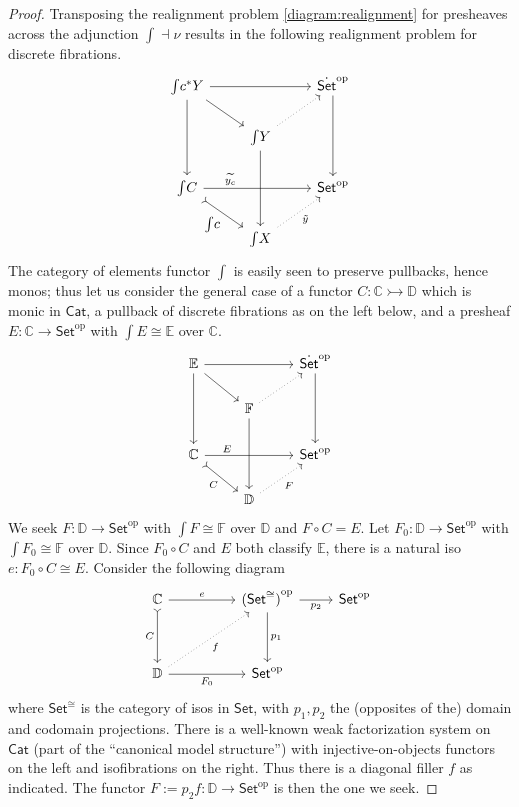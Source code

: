 \documentclass[11pt]{article}
\newcommand{\C}{\ensuremath{\mathbb{C}}}
\newcommand{\D}{\ensuremath{\mathbb{D}}}
\newcommand{\op}[1]{\ensuremath{{#1}^{\mathrm{op}}}}
\newcommand{\Set}{\ensuremath{\mathsf{Set}}}
\newcommand{\Cat}{\ensuremath{\mathsf{Cat}}}
\newcommand{\mono}{\ensuremath{\rightarrowtail}}
\renewcommand{\to}{\ensuremath{\rightarrow}}
\newcommand{\elem}[1]{\textstyle\int\!{#1}}
\theoremstyle{remark}
\theoremstyle{definition}
\begin{document}
\begin{proof}
Transposing the realignment problem \eqref{diagram:realignment} for presheaves across the adjunction $\int\dashv \nu$ results in the following realignment problem for discrete fibrations.
\begin{equation}\label{diagram:realignment2}
\begin{tikzcd}
\elem  c^*Y \ar[dd] \ar[rd] \ar[rr] && \op{\dot{\Set}}  \ar[dd] \\
&\elem  Y \ar[dd] \ar[ru, dotted] & \\
\elem  C  \ar[rd, tail,swap, "{\elem  c}"] \ar[rr, near start, "\widetilde{y_c}"] && \op{{\Set}}   \\
& \elem  X \ar[ru, dotted, swap, "\tilde{y}"] &
\end{tikzcd}
\end{equation}
The category of elements functor $\int $ is easily seen to preserve pullbacks, hence monos; thus let us consider the general case of a functor  $C : \C \mono \D$ which is monic in $\Cat$, a pullback of discrete fibrations as on the left below, and a presheaf $E : \C \to  \op{{\Set}}$ with $\elem E \cong \mathbb{E}$ over $\C$. 
\begin{equation}\label{diagram:realignment3}
\begin{tikzcd}
\mathbb{E} \ar[dd] \ar[rd] \ar[rr] && \op{\dot{\Set}}  \ar[dd] \\
& \mathbb{F}  \ar[dd] \ar[ru, dotted] & \\
\C  \ar[rd, tail,swap, "{C}"] \ar[rr, near start, "E"] && \op{{\Set}}   \\
& \D \ar[ru, dotted, swap, "F"] &
\end{tikzcd}
\end{equation}
We seek $F : \D \to  \op{{\Set}}$ with $\elem F \cong \mathbb{F}$ over $\D$ and $F\circ C = E$.  Let $F_0 : \D \to  \op{\Set}$ with $\elem F_0 \cong \mathbb{F}$ over $\D$.  Since $F_0\circ C$ and $E$ both classify $\mathbb{E}$, there is a natural iso $e : F_0\circ C \cong E$.
Consider the following diagram
\begin{equation}\label{diagram:realignment4}
\begin{tikzcd}
\C \ar[dd, tail, swap, "{C}"]  \ar[rr, "e"] && {\op{(\Set^{\cong})}}  \ar[dd,"{p_1}"] \ar[r,swap,"{p_2}"] &  {\op{\Set}} \\
&&&\\
\D  \ar[rr,swap, "F_0"]  \ar[rruu, dotted, swap, "f"] && \op{\Set} & 
\end{tikzcd}
\end{equation}
where $\Set^{\cong}$ is the category of isos in $\Set$, with $p_1, p_2$ the (opposites of the) domain and codomain projections.  There is a well-known weak factorization system on $\Cat$ (part of the ``canonical model structure'') with injective-on-objects functors on the left and isofibrations on the right.  Thus there is a diagonal filler $f$ as indicated.  The functor $F := p_2 f : \D \to \op{\Set}$ is then  the one we seek.
\end{proof}
\end{document}

